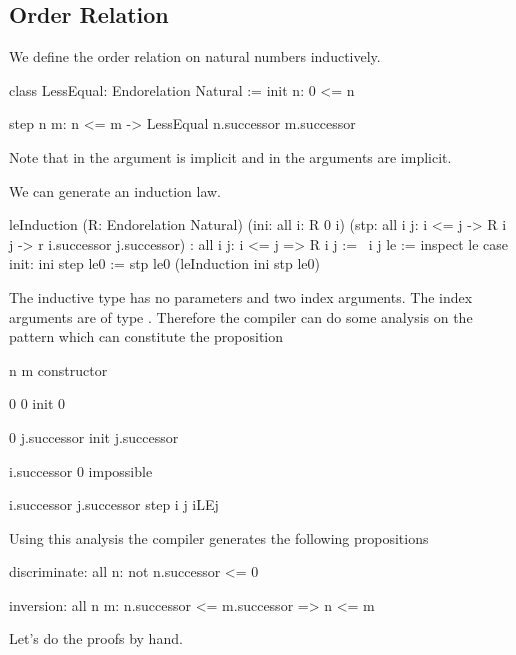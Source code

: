 \subsection{Order Relation}

We define the order relation on natural numbers inductively.

\begin{alba}
    class
        LessEqual: Endorelation Natural
    :=
        init {n}:
            0 <= n

        step {n m}:
            n <= m
            -> LessEqual n.successor m.successor
\end{alba}
%
Note that in  the argument  is implicit and in  the arguments  are implicit.

We can generate an induction law.
\begin{alba}
    leInduction
        (R: Endorelation Natural)
        (ini: all i: R 0 i)
        (stp: all i j: i <= j -> R i j -> r i.successor j.successor)
        : all {i j}: i <= j => R i j
    :=
        \ i j le :=
            inspect le case
                init: ini
                step le0 := stp le0 (leInduction ini stp le0)
\end{alba}

The inductive type has no parameters and two index arguments. The index
arguments are of type . Therefore the compiler can do some analysis
on the pattern which can constitute the proposition 

\begin{alba}
        n               m                   constructor

        0               0                   init 0

        0               j.successor         init j.successor

        i.successor     0                   impossible

        i.successor     j.successor         step i j iLEj
\end{alba}
%
Using this analysis the compiler generates the following propositions
\begin{alba}
    discriminate: all n: not n.successor <= 0

    inversion: all n m: n.successor <= m.successor => n <= m
\end{alba}

Let's do the proofs by hand.

